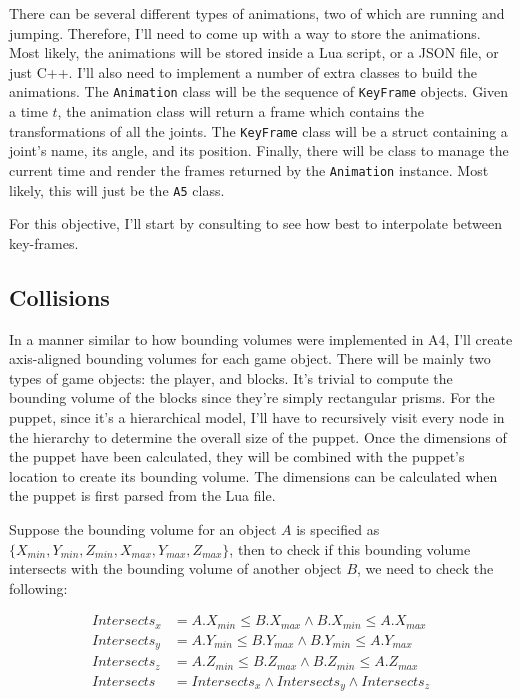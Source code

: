\documentclass[11pt]{article}
\begin{document}
There can be several different types of animations, two of which are running and jumping. Therefore, I'll need to come up with a way to store the animations. Most likely, the animations will be stored inside a Lua script, or a JSON file, or just C++. I'll also need to implement a number of extra classes to build the animations. The \verb|Animation| class will be the sequence of \verb|KeyFrame| objects. Given a time $t$, the animation class will return a frame which contains the transformations of all the joints. The \verb|KeyFrame| class will be a struct containing a joint's name, its angle, and its position. Finally, there will be class to manage the current time and render the frames returned by the \verb|Animation| instance. Most likely, this will just be the \verb|A5| class.

For this objective, I'll start by consulting \cite{interactive-computer-graphics} to see how best to interpolate between key-frames.

\subsection*{Collisions}
In a manner similar to how bounding volumes were implemented in A4, I'll create axis-aligned bounding volumes for each game object. There will be mainly two types of game objects: the player, and blocks. It's trivial to compute the bounding volume of the blocks since they're simply rectangular prisms. For the puppet, since it's a hierarchical model, I'll have to recursively visit every node in the hierarchy to determine the overall size of the puppet. Once the dimensions of the puppet have been calculated, they will be combined with the puppet's location to create its bounding volume. The dimensions can be calculated when the puppet is first parsed from the Lua file.

Suppose the bounding volume for an object $A$ is specified as $\{X_{min}, Y_{min}, Z_{min}, X_{max}, Y_{max}, Z_{max}\}$, then to check if this bounding volume intersects with the bounding volume of another object $B$, we need to check the following:

\begin{align*}
Intersects_x &= A.X_{min} \leq B.X_{max} \land B.X_{min} \leq A.X_{max} \\
Intersects_y &= A.Y_{min} \leq B.Y_{max} \land B.Y_{min} \leq A.Y_{max} \\
Intersects_z &= A.Z_{min} \leq B.Z_{max} \land B.Z_{min} \leq A.Z_{max} \\
Intersects &= Intersects_x \land Intersects_y \land Intersects_z
\end{align*}
\end{document}
